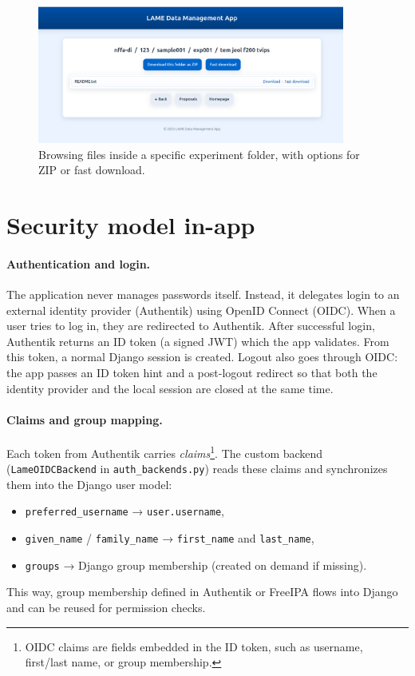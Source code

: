 \begin{figure}[!h]
	\centering
	\includegraphics[width=0.9\textwidth]{img/chpt5/ui_bucket_experiment.png}
	\caption{Browsing files inside a specific experiment folder, with options for ZIP or fast download.}
	\label{fig:ui-bucket-experiment}
\end{figure}


\FloatBarrier
\section{Security model in-app}\label{sec:security}

\paragraph{Authentication and login.}
The application never manages passwords itself. Instead, it delegates login to 
an external identity provider (Authentik) using OpenID Connect (OIDC).  
When a user tries to log in, they are redirected to Authentik.  
After successful login, Authentik returns an ID token (a signed JWT) which 
the app validates. From this token, a normal Django session is created.  
Logout also goes through OIDC: the app passes an ID token hint and a 
post-logout redirect so that both the identity provider and the local session 
are closed at the same time.

\paragraph{Claims and group mapping.}
Each token from Authentik carries \emph{claims}\footnote{OIDC claims are 
	fields embedded in the ID token, such as username, first/last name, or group 
	membership.}. The custom backend (\texttt{LameOIDCBackend} in 
\texttt{auth\_backends.py}) reads these claims and synchronizes them into the 
Django user model:
\begin{itemize}
	\item \texttt{preferred\_username} → \texttt{user.username},  
	\item \texttt{given\_name} / \texttt{family\_name} → \texttt{first\_name} and \texttt{last\_name},  
	\item \texttt{groups} → Django group membership (created on demand if missing).  
\end{itemize}
This way, group membership defined in Authentik or FreeIPA flows into Django 
and can be reused for permission checks.

